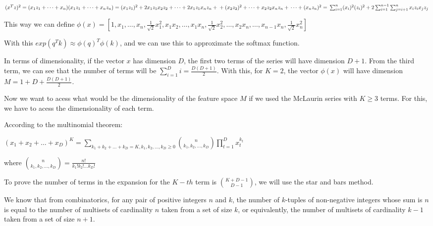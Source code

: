 \documentclass{article}
\begin{document}
\medskip

$ (x^Tz)^2 = (x_1z_1 + \dots + x_n)(x_1z_1 + \dots + x_nz_n) = \\
(x_1z_1)^2 + 2x_1z_1x_2z_2 + \dots + 2x_1z_1x_nz_n + \\
+ (x_2z_2)^2 + \dots + x_2z_2x_nz_n + \\
\dots + \\
 (x_nz_n)^2 = \\
\sum_{i=1}^n (x_i)^2(z_i)^2 + 2\sum_{i=1}^{n-1} \sum_{j=i+1}^{n} x_iz_ix_jz_j \\
$

This way we can define $\phi(x) = [1, x_1, \dots, x_n, 
\frac{1}{\sqrt{2}}x_1^{2}, x_1x_2, \dots, x_1x_n, \frac{1}{\sqrt{2}}x_2^{2}, \dots, 
x_2x_n, \dots, x_{n-1}x_n , \frac{1}{\sqrt{2}}x_n^{2}]$

With this $exp(q^Tk) \approx \phi(q)^T \phi(k)$, and we can use this to approximate the softmax function.

\bigskip

In terms of dimensionality, if the vector $x$ has dimension $D$, the first two terms of the series will have dimension $D + 1$. From the 
third term, we can see that the number of terms will be $\sum_{i=1}^{D} i = \frac{D(D+1)}{2}$. With this, for $K = 2$, 
the vector $\phi(x)$ will have dimension $M = 1 + D + \frac{D(D+1)}{2}$.

\bigskip

Now we want to acess what would be the dimensionality of the feature space $M$ if we used the McLaurin series with $K \geq 3$ terms.
For this, we have to acess the dimensionality of each term.

\bigskip

According to the multinomial theorem:

\medskip

$ (x_1 + x_2 + \dots + x_D)^K = \sum_{k_1 + k_2 + \dots + k_D = K, k_1, k_2, \dots, k_D\geq0} \binom{n}{k_1, k_2, \dots, k_D} \prod_{t=1}^D x_t^{k_t}$

where $\binom{n}{k_1, k_2, \dots, k_D} = \frac{n!}{k_1!k_2!\dots k_D!}$

\bigskip

To prove the number of terms in the expansion for the $K-th$ term is $\binom{K + D - 1}{D - 1}$, we will use the star and bars method.

We know that from combinatorics, for any pair of positive integers $n$ and $k$, the number of $k$-tuples of non-negative integers whose sum is $n$ is equal to the number of 
multisets of cardinality $n$ taken from a set of size $k$, or equivalently, the number of multisets of cardinality $k - 1$ taken from a set of size $n + 1$.
\end{document}
